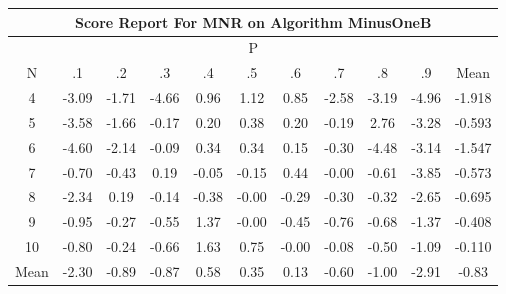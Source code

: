 \documentclass[11pt,a4paper]{report}
\begin{document}
\begin{longtable}{ | c || c | c | c | c | c | c | c | c | c || c |}
\hline
\multicolumn{11}{|c|}{ Score Report For MNR on Algorithm MinusOneB} \\
\hline
\multicolumn{11}{|c|}{ P } \\
\hline
N & .1 & .2 & .3 & .4 & .5 & .6 & .7 & .8 & .9 & Mean\\
 \hline
 \hline
 \endhead
  4 &  \cellcolor[HTML]{FFAFAF} -3.09 &  \cellcolor[HTML]{FFD7D7} -1.71 &  \cellcolor[HTML]{FF8787} -4.66 &  \cellcolor[HTML]{E7E7FF} 0.96 &  \cellcolor[HTML]{DFDFFF} 1.12 &  \cellcolor[HTML]{E7E7FF} 0.85 &  \cellcolor[HTML]{FFBFBF} -2.58 &  \cellcolor[HTML]{FFAFAF} -3.19 &  \cellcolor[HTML]{FF8080} -4.96 & -1.918 \\
  5 &  \cellcolor[HTML]{FFA7A7} -3.58 &  \cellcolor[HTML]{FFD7D7} -1.66 &  \cellcolor[HTML]{FFF7F7} -0.17 &  \cellcolor[HTML]{F7F7FF} 0.20 &  \cellcolor[HTML]{F7F7FF} 0.38 &  \cellcolor[HTML]{F7F7FF} 0.20 &  \cellcolor[HTML]{FFF7F7} -0.19 &  \cellcolor[HTML]{B7B7FF} 2.76 &  \cellcolor[HTML]{FFAFAF} -3.28 & -0.593 \\
  6 &  \cellcolor[HTML]{FF8F8F} -4.60 &  \cellcolor[HTML]{FFC7C7} -2.14 &  \cellcolor[HTML]{FFFFFF} -0.09 &  \cellcolor[HTML]{F7F7FF} 0.34 &  \cellcolor[HTML]{F7F7FF} 0.34 &  \cellcolor[HTML]{FFFFFF} 0.15 &  \cellcolor[HTML]{FFF7F7} -0.30 &  \cellcolor[HTML]{FF8F8F} -4.48 &  \cellcolor[HTML]{FFAFAF} -3.14 & -1.547 \\
  7 &  \cellcolor[HTML]{FFEFEF} -0.70 &  \cellcolor[HTML]{FFF7F7} -0.43 &  \cellcolor[HTML]{F7F7FF} 0.19 &  \cellcolor[HTML]{FFFFFF} -0.05 &  \cellcolor[HTML]{FFFFFF} -0.15 &  \cellcolor[HTML]{F7F7FF} 0.44 &  \cellcolor[HTML]{FFFFFF} -0.00 &  \cellcolor[HTML]{FFEFEF} -0.61 &  \cellcolor[HTML]{FF9F9F} -3.85 & -0.573 \\
  8 &  \cellcolor[HTML]{FFC7C7} -2.34 &  \cellcolor[HTML]{F7F7FF} 0.19 &  \cellcolor[HTML]{FFFFFF} -0.14 &  \cellcolor[HTML]{FFF7F7} -0.38 &  \cellcolor[HTML]{FFFFFF} -0.00 &  \cellcolor[HTML]{FFF7F7} -0.29 &  \cellcolor[HTML]{FFF7F7} -0.30 &  \cellcolor[HTML]{FFF7F7} -0.32 &  \cellcolor[HTML]{FFBFBF} -2.65 & -0.695 \\
  9 &  \cellcolor[HTML]{FFE7E7} -0.95 &  \cellcolor[HTML]{FFF7F7} -0.27 &  \cellcolor[HTML]{FFEFEF} -0.55 &  \cellcolor[HTML]{DFDFFF} 1.37 &  \cellcolor[HTML]{FFFFFF} -0.00 &  \cellcolor[HTML]{FFF7F7} -0.45 &  \cellcolor[HTML]{FFEFEF} -0.76 &  \cellcolor[HTML]{FFEFEF} -0.68 &  \cellcolor[HTML]{FFDFDF} -1.37 & -0.408 \\
  10 &  \cellcolor[HTML]{FFE7E7} -0.80 &  \cellcolor[HTML]{FFF7F7} -0.24 &  \cellcolor[HTML]{FFEFEF} -0.66 &  \cellcolor[HTML]{D7D7FF} 1.63 &  \cellcolor[HTML]{EFEFFF} 0.75 &  \cellcolor[HTML]{FFFFFF} -0.00 &  \cellcolor[HTML]{FFFFFF} -0.08 &  \cellcolor[HTML]{FFEFEF} -0.50 &  \cellcolor[HTML]{FFE7E7} -1.09 & -0.110 \\
 \hline
 \hline
Mean &  \cellcolor[HTML]{FFC7C7} -2.30 &  \cellcolor[HTML]{FFE7E7} -0.89 &  \cellcolor[HTML]{FFE7E7} -0.87 &  \cellcolor[HTML]{EFEFFF} 0.58 &  \cellcolor[HTML]{F7F7FF} 0.35 &  \cellcolor[HTML]{FFFFFF} 0.13 &  \cellcolor[HTML]{FFEFEF} -0.60 &  \cellcolor[HTML]{FFE7E7} -1.00 &  \cellcolor[HTML]{FFB7B7} -2.91 &  \cellcolor[HTML]{FFE7E7} -0.83
\end{longtable}
\end{document}
